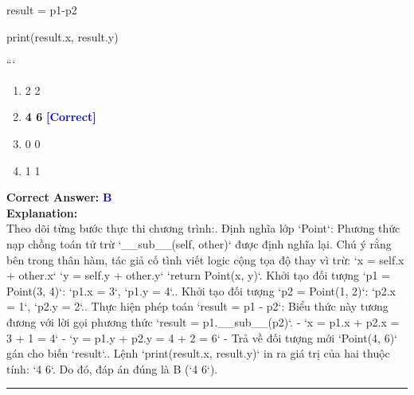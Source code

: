 \documentclass[11pt,a4paper]{article}
\begin{document}
\begin{minipage}{\textwidth}
{\newline
result = p1-p2\newline

\newline
print(result.x, result.y)\newline

\newline
```}

\begin{enumerate}[label=\Alph*.]
    \item 2 2
    \item \textbf{4 6} \hfill \textcolor{blue}{\textbf{[Correct]}}
    \item 0 0
    \item 1 1
\end{enumerate}

\noindent \textbf{Correct Answer:} \textcolor{blue}{\textbf{B}} \\[4pt]
\noindent \textbf{Explanation:}\\
Theo dõi từng bước thực thi chương trình:. Định nghĩa lớp `Point`: Phương thức nạp chồng toán tử trừ `__sub__(self, other)` được định nghĩa lại. Chú ý rằng bên trong thân hàm, tác giả cố tình viết logic cộng tọa độ thay vì trừ:\newline
   `x = self.x + other.x`\newline
   `y = self.y + other.y`\newline
   `return Point(x, y)`. Khởi tạo đối tượng `p1 = Point(3, 4)`: `p1.x = 3`, `p1.y = 4`.. Khởi tạo đối tượng `p2 = Point(1, 2)`: `p2.x = 1`, `p2.y = 2`.. Thực hiện phép toán `result = p1 - p2`: Biểu thức này tương đương với lời gọi phương thức `result = p1.__sub__(p2)`.\newline
   - `x = p1.x + p2.x = 3 + 1 = 4`\newline
   - `y = p1.y + p2.y = 4 + 2 = 6`\newline
   - Trả về đối tượng mới `Point(4, 6)` gán cho biến `result`.. Lệnh `print(result.x, result.y)` in ra giá trị của hai thuộc tính: `4 6`.\newline
Do đó, đáp án đúng là B (`4 6`).
\end{minipage}
\vspace{0.8cm}
\hrule
\vspace{0.5cm}
\end{document}
